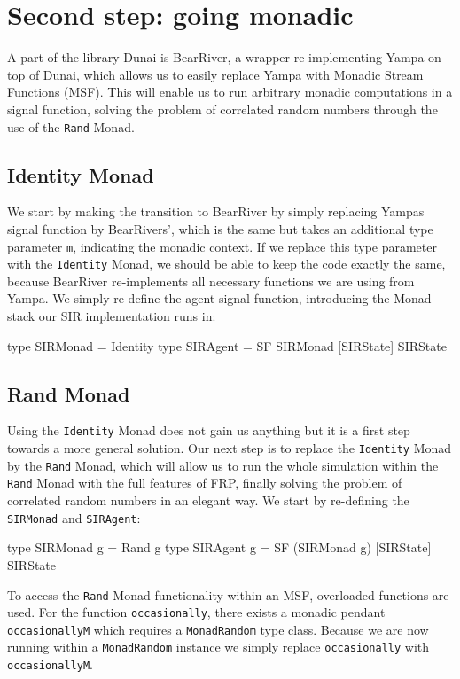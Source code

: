 \section{Second step: going monadic}
\label{sec:timedriven_monadic}
A part of the library Dunai is BearRiver, a wrapper re-implementing Yampa on top of Dunai, which allows us to easily replace Yampa with Monadic Stream Functions (MSF). This will enable us to run arbitrary monadic computations in a signal function, solving the problem of correlated random numbers through the use of the \texttt{Rand} Monad.

\subsection{Identity Monad}
We start by making the transition to BearRiver by simply replacing Yampas signal function by BearRivers', which is the same but takes an additional type parameter \texttt{m}, indicating the monadic context. If we replace this type parameter with the \texttt{Identity} Monad, we should be able to keep the code exactly the same, because BearRiver re-implements all necessary functions we are using from Yampa. We simply re-define the agent signal function, introducing the Monad stack our SIR implementation runs in:

\begin{HaskellCode}
type SIRMonad = Identity
type SIRAgent = SF SIRMonad [SIRState] SIRState
\end{HaskellCode}

\subsection{Rand Monad}
Using the \texttt{Identity} Monad does not gain us anything but it is a first step towards a more general solution. Our next step is to replace the \texttt{Identity} Monad by the \texttt{Rand} Monad, which will allow us to run the whole simulation within the \texttt{Rand} Monad with the full features of FRP, finally solving the problem of correlated random numbers in an elegant way. We start by re-defining the \texttt{SIRMonad} and \texttt{SIRAgent}:

\begin{HaskellCode}
type SIRMonad g = Rand g
type SIRAgent g = SF (SIRMonad g) [SIRState] SIRState
\end{HaskellCode}

To access the \texttt{Rand} Monad functionality within an MSF, overloaded functions are used. For the function \texttt{occasionally}, there exists a monadic pendant \texttt{occasionallyM} which requires a \texttt{MonadRandom} type class. Because we are now running within a \texttt{MonadRandom} instance we simply replace \texttt{occasionally} with \texttt{occasionallyM}. 

